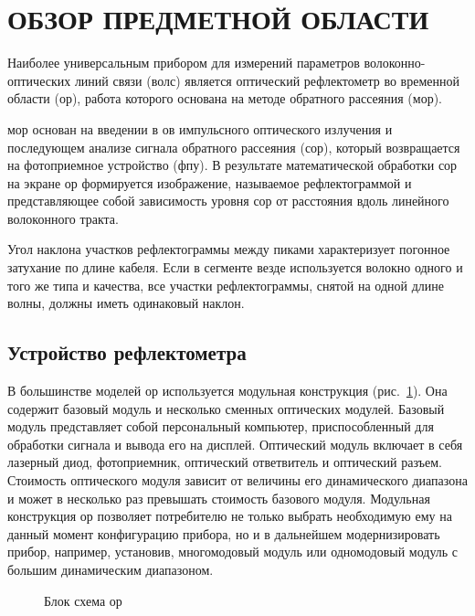 \section{ОБЗОР ПРЕДМЕТНОЙ ОБЛАСТИ}


Наиболее универсальным прибором для измерений параметров волоконно-оптических линий связи (\acrshort{волс}) является оптический рефлектометр во временной области (\acrshort{ор}), работа которого основана на методе обратного рассеяния (\acrshort{мор}).

\acrshort{мор} основан на введении в \acrshort{ов} импульсного оптического излучения и последующем анализе сигнала обратного рассеяния (\acrshort{сор}), который возвращается на фотоприемное устройство (\acrshort{фпу}). В результате математической обработки \acrshort{сор} на экране \acrshort{ор} формируется изображение, называемое рефлектограммой и представляющее собой зависимость уровня \acrshort{сор} от расстояния вдоль линейного волоконного тракта.~\cite{bogdanova:reflectometria} 

Угол наклона участков рефлектограммы между пиками характеризует погонное затухание по длине кабеля. Если в сегменте везде используется волокно одного и того же типа и качества, все участки рефлектограммы, снятой на одной длине волны, должны иметь одинаковый наклон.

\subsection{Устройство рефлектометра}

В большинстве моделей \acrshort{ор} используется модульная конструкция (рис.~\ref{ris:otdr_schematic}). Она содержит базовый модуль и несколько сменных оптических модулей. Базовый модуль представляет собой персональный компьютер, приспособленный для обработки сигнала и вывода его на дисплей. Оптический модуль включает в себя лазерный диод, фотоприемник, оптический ответвитель и оптический разъем. Стоимость оптического модуля зависит от величины его динамического диапазона и может в несколько раз превышать стоимость базового модуля. Модульная конструкция \acrshort{ор} позволяет потребителю не только выбрать необходимую ему на данный момент конфигурацию прибора, но и в дальнейшем модернизировать прибор, например, установив, многомодовый модуль или одномодовый модуль с большим динамическим диапазоном.

\begin{figure}[h]
  \caption{Блок схема \acrshort{ор}}
  \label{ris:otdr_schematic}
\end{figure}

